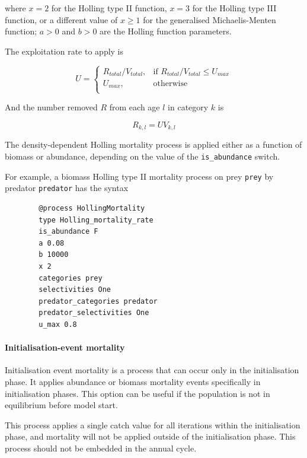 where $x=2$ for the Holling type II function, $x=3$ for the Holling type III function, or a different value of $x \geq 1$ for the generalised Michaelis-Menten function; $a > 0$ and $b > 0$ are the Holling function parameters.

The exploitation rate to apply is

\begin{equation}
	U = \begin{cases}
		R_{total}/V_{total}, & \text{if $R_{total}/V_{total} \leq U_{max}$} \\
		U_{max}, & \text{otherwise}\\
	\end{cases}
\end{equation}

And the number removed $R$ from each age $l$ in category $k$ is

\begin{equation}
	R_{k,l} = U V_{k,l}
\end{equation}

The density-dependent Holling mortality process is applied either as a function of biomass or abundance, depending on the value of the \texttt{is\_abundance} switch.

For example, a biomass Holling type II mortality process on prey \texttt{prey} by predator \texttt{predator} has the syntax

{\small{\begin{verbatim}
		@process HollingMortality
		type Holling_mortality_rate
		is_abundance F
		a 0.08
		b 10000
		x 2
		categories prey
		selectivities One
		predator_categories predator
		predator_selectivities One
		u_max 0.8
\end{verbatim}}}

\paragraph{Initialisation-event mortality}\label{sec:Process-MortalityInitialisationEvent}\label{sec:Process-MortalityInitialisationEventBiomass} 

Initialisation event mortality is a process that can occur only in the initialisation phase. It applies abundance or biomass mortality events specifically in initialisation phases. This option can be useful if the population is not in equilibrium before model start.

This process applies a single catch value for all iterations within the initialisation phase, and mortality will not be applied outside of the initialisation phase. This process should not be embedded in the annual cycle.

